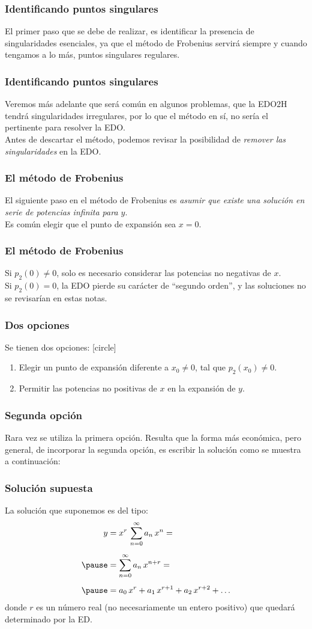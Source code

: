 \documentclass[12pt]{beamer}
\begin{document}
\begin{frame}
\frametitle{Identificando puntos singulares}
El primer paso que se debe de realizar, es identificar la presencia de singularidades esenciales, ya que el método de Frobenius servirá siempre y cuando tengamos a lo más, puntos singulares regulares.
\end{frame}
\begin{frame}
\frametitle{Identificando puntos singulares}Veremos más adelante que será común en algunos problemas, que la EDO2H tendrá singularidades irregulares, por lo que el método en sí, no sería el pertinente para resolver la EDO.
\\
\bigskip
\pause
Antes de descartar el método, podemos revisar la posibilidad de \emph{remover las singularidades} en la EDO.
\end{frame}
\begin{frame}
\frametitle{El método de Frobenius}
El siguiente paso en el método de Frobenius es \emph{asumir que existe una solución en serie de potencias infinita para $y$}.
\\
\bigskip
Es común elegir que el punto de expansión sea $x = 0$.
\end{frame}
\begin{frame}
\frametitle{El método de Frobenius}
Si $p_{2} (0) \neq 0$, solo es necesario considerar las potencias no negativas de $x$.
\\
\bigskip
\pause
Si $p_{2} (0) = 0$, la EDO pierde su carácter de \enquote{segundo orden}, y las soluciones no se revisarían en estas notas.
\end{frame}
\begin{frame}
\frametitle{Dos opciones}
Se tienen dos opciones:
[circle]
\begin{enumerate}[<+->]
\item Elegir un punto de expansión diferente a $x_{0} \neq 0$, tal que $p_{2} (x_{0}) \neq 0$.
\item Permitir las potencias no positivas de $x$ en la expansión de $y$.
\end{enumerate}
\end{frame}
\begin{frame}
\frametitle{Segunda opción}
Rara vez se utiliza la primera opción. Resulta que la forma más económica, pero general, de incorporar la segunda opción, es escribir la solución como se muestra a continuación:
\end{frame}
\begin{frame}
\frametitle{Solución supuesta}
La solución que suponemos es del tipo:
\begin{eqnarray}
\begin{aligned}
y &= x^{r} \, \sum_{n=0}^{\infty} a_{n} \, x^{n} = \\[0.5em] \pause
&= \sum_{n=0}^{\infty} a_{n} \, x^{n+r} = \\[0.5em] \pause
&= a_{0} \, x^{r} + a_{1} \, x^{r+1} + a_{2} \, x^{r+2} + \ldots
\end{aligned}
\label{eq:ecuacion_26_08}    
\end{eqnarray}
donde $r$ es un número real (no necesariamente un entero positivo) que quedará determinado por la ED.
\end{frame}
\end{document}
